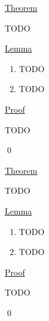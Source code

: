 \documentclass{article}
\begin{document}
\pagebreak

\underline{Theorem}
\begin{addmargin}[0.75cm]{0cm}
	TODO
\end{addmargin}

\underline{Lemma}
\renewcommand{\labelenumi}{(\alph{enumi})}
\begin{enumerate}[leftmargin=1.35cm]
	\item TODO
	\item TODO
\end{enumerate}

\underline{Proof}
\begin{addmargin}[0.75cm]{0cm}
	TODO
	
	\qed
\end{addmargin}


\pagebreak

\underline{Theorem}
\begin{addmargin}[0.75cm]{0cm}
	TODO
\end{addmargin}

\underline{Lemma}
\renewcommand{\labelenumi}{(\alph{enumi})}
\begin{enumerate}[leftmargin=1.35cm]
	\item TODO
	\item TODO
\end{enumerate}

\underline{Proof}
\begin{addmargin}[0.75cm]{0cm}
	TODO
	
	\qed
\end{addmargin}
\end{document}

